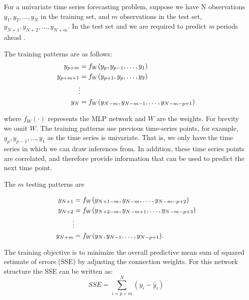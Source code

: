 \documentclass[final,3p,times,twocolumn,numbers]{elsarticle}
\begin{document}

For a univariate time series forecasting problem, suppose we have N observations $y_1, y_2, \ldots, y_N$ in the training set, and $m$ observations in the test set, $y_{N+1}, y_{N+2}, \ldots, y_{N+m}$. In the test set and we are required to predict \textit{m} periods ahead \cite{Pao2007}. 

The training patterns are as follows:
\begin{align}
y_{p+m} & =f_{W}(y_p, y_{p-1},\ldots,y_1)\\
y_{p+m+1} & =f_{W}(y_{p+1}, y_{p},\ldots,y_2)\\
&\vdotswithin  \notag \\
y_{N} & =f_{W}(y_{N-m},y_{N-m-1},\ldots,y_{N-m-p+1})
\end{align}

\noindent where $f_{W}(\cdot)$ represents the MLP network and $W$ are the weights. For brevity we omit $W$. The training patterns use previous time-series points, for example, $y_p, y_{p-1},\ldots,y_1$ as the time series is univariate. That is, we only have the time series in which we can draw inferences from. In addition, these time series points are correlated, and therefore provide information that can be used to predict the next time point.

The $m$ testing patterns are 

\begin{align}
y_{N+1} & =f_{W}(y_{N+1-m}, y_{N-m},\ldots,y_{N-m-p+2})\\
y_{N+2} & =f_{W}(y_{N+2-m}, y_{N-m+1},\ldots,y_{N-m-p+3})\\
&\vdotswithin  \notag \\
y_{N+m} & =f_{W}(y_{N},y_{N-1},\ldots,y_{N-p+1}).
\end{align}

The training objective is to minimize the overall predictive mean sum of squared estimate of errors (SSE) by adjusting the connection weights. For this network structure the SSE can be written as:
\begin{equation}
SSE = \sum_{i=p+m}^N(y_i-\hat{y}_i)
\end{equation}
\end{document}
